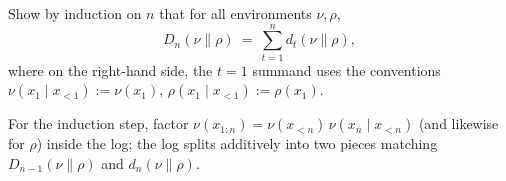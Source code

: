 \documentclass[fontsize=11pt, parskip=half]{scrartcl}
\begin{document}
\begin{exercise}[Telescoping KL]
\label{prob:telescope_ex}



Show by induction on $n$ that for all environments $\nu, \rho$,
\[
D_n(\nu \parallel \rho) ~=~ \sum_{t=1}^{n} d_t(\nu \parallel \rho),
\]
where on the right-hand side, the $t=1$ summand uses the conventions $\nu(x_1 \mid x_{<1}) := \nu(x_1)$, $\rho(x_1 \mid x_{<1}) := \rho(x_1)$.

\begin{hint}
For the induction step, factor $\nu(x_{1:n}) = \nu(x_{<n})\,\nu(x_n \mid x_{<n})$ (and likewise for $\rho$) inside the log; the log splits additively into two pieces matching $D_{n-1}(\nu \parallel \rho)$ and $d_n(\nu \parallel \rho)$.
\end{hint}
\end{exercise}
\end{document}
